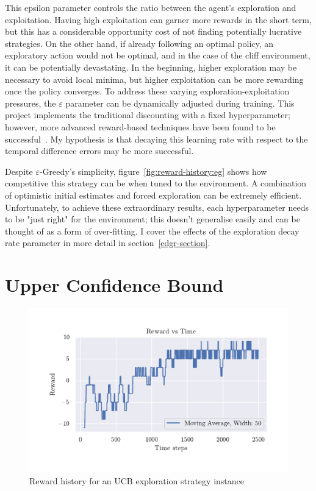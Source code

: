 \documentclass[]{final_report}
\begin{document}
This epsilon parameter controls the ratio between the agent's exploration and exploitation. Having high exploitation can garner more rewards in the short term, but this has a considerable opportunity cost of not finding potentially lucrative strategies. On the other hand, if already following an optimal policy, an exploratory action would not be optimal, and in the case of the cliff environment, it can be potentially devastating. In the beginning, higher exploration may be necessary to avoid local minima, but higher exploitation can be more rewarding once the policy converges. To address these varying exploration-exploitation pressures, the $\varepsilon$ parameter can be dynamically adjusted during training. This project implements the traditional discounting with a fixed hyperparameter; however, more advanced reward-based techniques have been found to be successful~\cite{rewardEpsilonDecay}. My hypothesis is that decaying this learning rate with respect to the temporal difference errors may be more successful. 

Despite $\varepsilon$-Greedy's simplicity, figure~\ref{fig:reward-history:eg} shows how competitive this strategy can be when tuned to the environment. A combination of optimistic initial estimates and forced exploration can be extremely efficient. Unfortunately, to achieve these extraordinary results, each hyperparameter needs to be "just right" for the environment; this doesn't generalise easily and can be thought of as a form of over-fitting. I cover the effects of the exploration decay rate parameter in more detail in section~\ref{edgr-section}.


\section{Upper Confidence Bound}

\begin{figure}[H]
  \centering
  
  \includegraphics[trim={0 1cm 0 1cm},clip,width=\textwidth]{reward-history/UCB.pdf}
  
  \caption{\label{fig:reward-history:ucb} Reward history for an UCB exploration strategy instance}
\end{figure}
\end{document}
